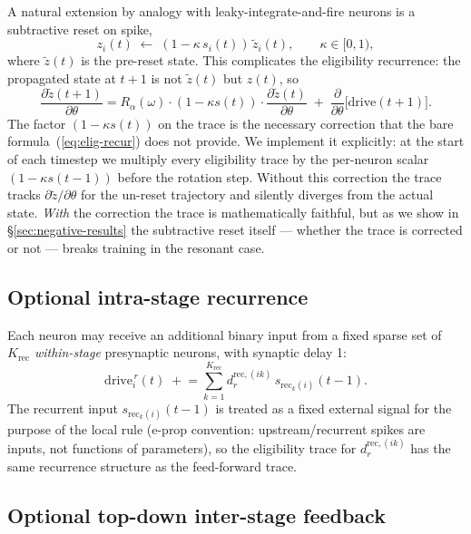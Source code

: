 \documentclass[11pt]{article}
\begin{document}
A natural extension by analogy with leaky-integrate-and-fire neurons
is a subtractive reset on spike,
\begin{equation}
z_i(t) \;\leftarrow\; (1 - \kappa\, s_i(t))\, \tilde z_i(t),
\qquad \kappa \in [0, 1),
\end{equation}
where $\tilde z(t)$ is the pre-reset state. This complicates the
eligibility recurrence: the propagated state at $t+1$ is not
$\tilde z(t)$ but $z(t)$, so
\begin{equation}
\frac{\partial \tilde z(t+1)}{\partial \theta}
= R_\alpha(\omega) \cdot (1 - \kappa s(t)) \cdot \frac{\partial \tilde z(t)}{\partial\theta}
\;+\; \frac{\partial}{\partial\theta}\!\big[\text{drive}(t+1)\big].
\label{eq:trace-with-reset}
\end{equation}
The factor $(1 - \kappa s(t))$ on the trace is the necessary
correction that the bare formula~(\ref{eq:elig-recur}) does not
provide. We implement it explicitly: at the start of each timestep we
multiply every eligibility trace by the per-neuron scalar
$(1 - \kappa s(t-1))$ before the rotation step. Without this
correction the trace tracks
$\partial \tilde z / \partial \theta$ for the un-reset trajectory and
silently diverges from the actual state. \emph{With} the correction
the trace is mathematically faithful, but as we show in
\S\ref{sec:negative-results} the subtractive reset itself --- whether
the trace is corrected or not --- breaks training in the resonant
case.

\subsection{Optional intra-stage recurrence}\label{sec:spiking-rec}

Each neuron may receive an additional binary input from a fixed
sparse set of $K_{\text{rec}}$ \emph{within-stage} presynaptic
neurons, with synaptic delay 1:
\begin{equation}
\text{drive}_i^{\,r}(t) \;\mathrel{+}=\!\!\sum_{k=1}^{K_{\text{rec}}}\!\!d_r^{\text{rec},(ik)}\,
s_{\text{rec}_k(i)}(t-1).
\end{equation}
The recurrent input $s_{\text{rec}_k(i)}(t-1)$ is treated as a fixed
external signal for the purpose of the local rule (e-prop convention:
upstream/recurrent spikes are inputs, not functions of parameters), so
the eligibility trace for $d_r^{\text{rec},(ik)}$ has the same
recurrence structure as the feed-forward trace.

\subsection{Optional top-down inter-stage feedback}\label{sec:spiking-top}
\end{document}
